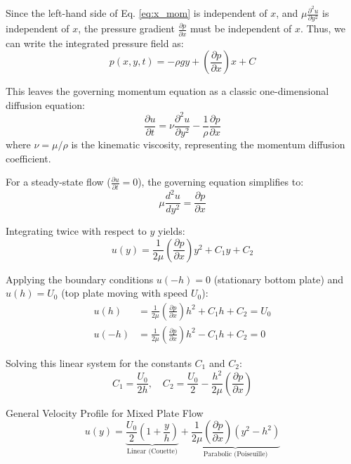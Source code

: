 Since the left-hand side of Eq. \eqref{eq:x_mom} is independent of $x$, and $\mu \frac{\partial^2 u}{\partial y^2}$ is independent of $x$, the pressure gradient $\frac{\partial p}{\partial x}$ must be independent of $x$. Thus, we can write the integrated pressure field as:
\begin{equation}
p(x, y, t) = -\rho g y + \left(\frac{\partial p}{\partial x}\right) x + C
\end{equation}

This leaves the governing momentum equation as a classic one-dimensional diffusion equation:
\begin{equation}
\frac{\partial u}{\partial t} = \nu \frac{\partial^2 u}{\partial y^2} - \frac{1}{\rho}\frac{\partial p}{\partial x}
\end{equation}
where $\nu = \mu/\rho$ is the kinematic viscosity, representing the momentum diffusion coefficient.

For a steady-state flow ($\frac{\partial u}{\partial t} = 0$), the governing equation simplifies to:
\begin{equation}
\mu \frac{d^2 u}{dy^2} = \frac{\partial p}{\partial x}
\end{equation}

Integrating twice with respect to $y$ yields:
\begin{equation}
u(y) = \frac{1}{2\mu} \left(\frac{\partial p}{\partial x}\right) y^2 + C_1 y + C_2
\end{equation}

Applying the boundary conditions $u(-h) = 0$ (stationary bottom plate) and $u(h) = U_0$ (top plate moving with speed $U_0$):
\begin{align}
u(h) &= \frac{1}{2\mu} \left(\frac{\partial p}{\partial x}\right) h^2 + C_1 h + C_2 = U_0 \\
u(-h) &= \frac{1}{2\mu} \left(\frac{\partial p}{\partial x}\right) h^2 - C_1 h + C_2 = 0
\end{align}

Solving this linear system for the constants $C_1$ and $C_2$:
\begin{equation}
C_1 = \frac{U_0}{2h}, \quad C_2 = \frac{U_0}{2} - \frac{h^2}{2\mu}\left(\frac{\partial p}{\partial x}\right)
\end{equation}

\begin{eqbox}{General Velocity Profile for Mixed Plate Flow}
\begin{equation}
u(y) = \underbrace{\frac{U_0}{2} \left( 1 + \frac{y}{h} \right)}_{\text{Linear (Couette)}} + \underbrace{\frac{1}{2\mu} \left( \frac{\partial p}{\partial x} \right) (y^2 - h^2)}_{\text{Parabolic (Poiseuille)}}
\end{equation}
\end{eqbox}

